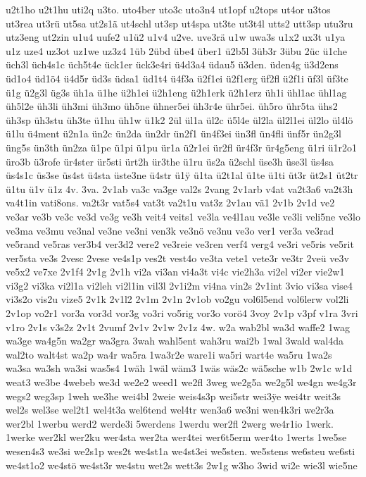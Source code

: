 {u2t1ho
u2t1hu
uti2q
u3to.
uto4ber
uto3c
uto3n4
ut1opf
u2tops
ut4or
u3tos
ut3rea
ut3rü
ut5sa
ut2s1ä
ut4schl
ut3sp
ut4spa
ut3te
ut3t4l
utts2
utt3sp
utu3ru
utz3eng
ut2zin
u1u4
uufe2
u1ü2
u1v4
u2ve.
uve3rä
u1w
uwa3s
u1x2
ux3t
u1ya
u1z
uze4
uz3ot
uz1we
uz3z4
1üb
2übd
übe4
über1
ü2b5l
3üb3r
3übu
2üc
ü1che
üch3l
üch4s1c
üch5t4e
ück1er
ück3e4ri
ü4d3a4
üdau5
ü3den.
üden4g
ü3d2ens
üd1o4
üd1ö4
ü4d5r
üd3s
üdsa1
üd1t4
ü4f3a
ü2f1ei
ü2f1erg
üf2fl
ü2f1i
üf3l
üf3te
ü1g
ü2g3l
üg3s
üh1a
ü1he
ü2h1ei
ü2h1eng
ü2h1erk
ü2h1erz
üh1i
ühl1ac
ühl1ag
üh5l2e
üh3li
üh3mi
üh3mo
üh5ne
ühner5ei
üh3r4e
ühr5ei.
üh5ro
ühr5ta
ühs2
üh3sp
üh3stu
üh3te
ü1hu
üh1w
ü1k2
2ül
ül1a
ül2c
ü5l4e
ül2la
ül2l1ei
ül2lo
ül4lö
ü1lu
ü4ment
ü2n1a
ün2c
ün2da
ün2dr
ün2f1
ün4f3ei
ün3fl
ün4fli
ünf5r
ün2g3l
üng5s
ün3th
ün2za
ü1pe
ü1pi
ü1pu
ür1a
ü2r1ei
ür2fl
ür4f3r
ür4g5eng
ü1ri
ü1r2o1
üro3b
ü3rofe
ür4ster
ür5sti
ürt2h
ür3the
ü1ru
üs2a
ü2schl
üse3h
üse3l
üs4sa
üs4s1c
üs3se
üs4st
ü4sta
üste3ne
ü4str
ü1^^ff
ü1ta
ü2t1al
ü1te
ü1ti
üt3r
üt2s1
üt2tr
ü1tu
ü1v
ü1z
4v.
3va.
2v1ab
va3c
va3ge
val2s
2vang
2v1arb
v4at
va2t3a6
va2t3h
va4t1in
vati8ons.
va2t3r
vat5s4
vat3t
va2t1u
vat3z
2v1au
vä1
2v1b
2v1d
ve2
ve3ar
ve3b
ve3c
ve3d
ve3g
ve3h
veit4
veits1
ve3la
ve4l1au
ve3le
ve3li
veli5ne
ve3lo
ve3ma
ve3mu
ve3nal
ve3ne
ve3ni
ven3k
ve3nö
ve3nu
ve3o
ver1
ver3a
ve3rad
ve5rand
ve5ras
ver3b4
ver3d2
vere2
ve3reie
ve3ren
verf4
verg4
ve3ri
ve5ris
ve5rit
ver5sta
ve3s
2vesc
2vese
ve4s1p
ves2t
vest4o
ve3ta
vete1
vete3r
ve3tr
2veü
ve3v
ve5x2
ve7xe
2v1f4
2v1g
2v1h
vi2a
vi3an
vi4a3t
vi4c
vie2h3a
vi2el
vi2er
vie2w1
vi3g2
vi3ka
vi2l1a
vi2leh
vi2l1in
vil3l
2v1i2m
vi4na
vin2s
2v1int
3vio
vi3sa
vise4
vi3s2o
vis2u
vize5
2v1k
2v1l2
2v1m
2v1n
2v1ob
vo2gu
vol6l5end
vol6lerw
vol2li
2v1op
vo2r1
vor3a
vor3d
vor3g
vo3ri
vo5rig
vor3o
vorö4
3voy
2v1p
v3pf
v1ra
3vri
v1ro
2v1s
v3s2z
2v1t
2vumf
2v1v
2v1w
2v1z
4w.
w2a
wab2bl
wa3d
waffe2
1wag
wa3ge
wa4g5n
wa2gr
wa3gra
3wah
wahl5ent
wah3ru
wai2b
1wal
3wald
wal4da
wal2to
walt4st
wa2p
wa4r
wa5ra
1wa3r2e
ware1i
wa5ri
wart4e
wa5ru
1wa2s
wa3sa
wa3sh
wa3si
was5s4
1wäh
1wäl
wäm3
1wäs
wäs2c
wä5sche
w1b
2w1c
w1d
weat3
we3be
4webeb
we3d
we2e2
weed1
we2fl
3weg
we2g5a
we2g5l
we4gn
we4g3r
wegs2
weg3sp
1weh
we3he
wei4bl
2weie
weis4s3p
wei5str
wei3^^ffe
wei4tr
weit3s
wel2s
wel3se
wel2t1
wel4t3a
wel6tend
wel4tr
wen3a6
we3ni
wen4k3ri
we2r3a
wer2bl
1werbu
werd2
werde3i
5werdens
1werdu
wer2fl
2werg
we4r1io
1werk.
1werke
wer2kl
wer2ku
wer4sta
wer2ta
wer4tei
wer6t5erm
wer4to
1werts
1we5se
wesen4s3
we3si
we2s1p
wes2t
we4st1a
we4st3ei
we5sten.
we5stens
we6steu
we6sti
we4st1o2
we4stö
we4st3r
we4stu
wet2s
wett3s
2w1g
w3ho
3wid
wi2e
wie3l
wie5ne
}
